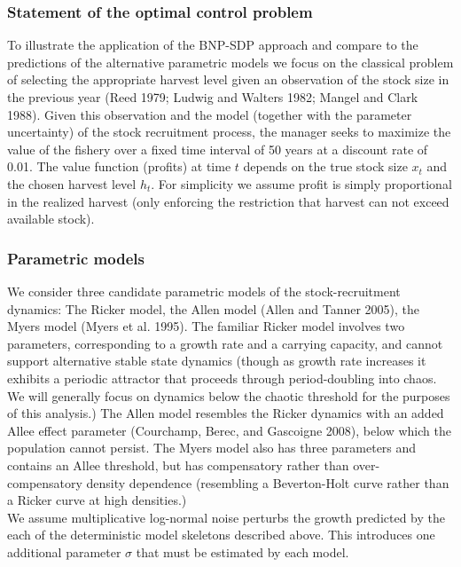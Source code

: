 \documentclass[author-year, review]{elsarticle} %
\begin{document}
\subsubsection{Statement of the optimal control
problem}\label{statement-of-the-optimal-control-problem}

To illustrate the application of the BNP-SDP approach and compare to the
predictions of the alternative parametric models we focus on the
classical problem of selecting the appropriate harvest level given an
observation of the stock size in the previous year (Reed 1979; Ludwig
and Walters 1982; Mangel and Clark 1988). Given this observation and the
model (together with the parameter uncertainty) of the stock recruitment
process, the manager seeks to maximize the value of the fishery over a
fixed time interval of 50 years at a discount rate of 0.01. The value
function (profits) at time $t$ depends on the true stock size $x_t$ and
the chosen harvest level $h_t$. For simplicity we assume profit is
simply proportional in the realized harvest (only enforcing the
restriction that harvest can not exceed available stock).

\subsubsection{Parametric models}\label{parametric-models}

We consider three candidate parametric models of the stock-recruitment
dynamics: The Ricker model, the Allen model (Allen and Tanner 2005), the
Myers model (Myers et al. 1995). The familiar Ricker model involves two
parameters, corresponding to a growth rate and a carrying capacity, and
cannot support alternative stable state dynamics (though as growth rate
increases it exhibits a periodic attractor that proceeds through
period-doubling into chaos. We will generally focus on dynamics below
the chaotic threshold for the purposes of this analysis.) The Allen
model resembles the Ricker dynamics with an added Allee effect parameter
(Courchamp, Berec, and Gascoigne 2008), below which the population
cannot persist. The Myers model also has three parameters and contains
an Allee threshold, but has compensatory rather than over-compensatory
density dependence (resembling a Beverton-Holt curve rather than a
Ricker curve at high densities.)\\We assume multiplicative log-normal
noise perturbs the growth predicted by the each of the deterministic
model skeletons described above. This introduces one additional
parameter $\sigma$ that must be estimated by each model.
\end{document}
